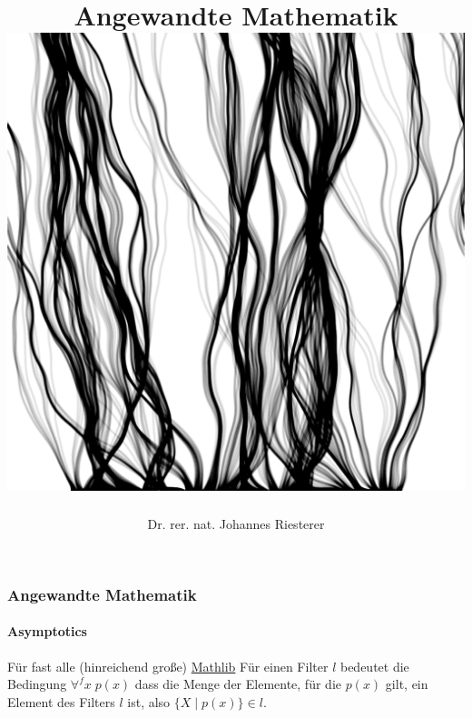 \documentclass{beamer}
\begin{document}
\title[Angewandte Mathematik] %
{Angewandte Mathematik
\\
\includegraphics[scale=0.15]{images/cover}
}
\subtitle{}
\author[Dr. Johannes Riesterer] %
{Dr.  rer. nat. Johannes Riesterer}

\date[KPT 2004] %
{}

\subject{Angewandte Mathematik}

\frame{\titlepage}

\begin{frame}
    \frametitle{Angewandte Mathematik}
    \framesubtitle{Asymptotics}
    \begin{block}{Für fast alle (hinreichend große) \href{https://github.com/leanprover-community/mathlib4/blob/418a5eb7aec3fb639097cb13f74fc031ac4057f2/Mathlib/Order/Filter/Defs.lean\#L243-L244}{Mathlib}}
        Für einen Filter $l$ bedeutet die Bedingung 
        \( \forall^f x \;  p(x) \) 
       dass die Menge der Elemente, für die \( p(x) \) gilt, ein Element des Filters \( l \) ist, also
        \( \{ X \; | \;  p(x) \} \in l \).
    \end{block}
\end{frame}
\end{document}
